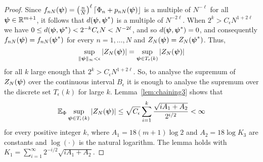 \documentclass[aap,preprint]{imsart}
\newcommand{\reals}{{\mathbb R}}
\newcommand{\expect}{{\mathbb E}}
\newcommand{\abs}[1]{\left\vert #1 \right\vert}
\newcommand{\sabs}[1]{\vert #1 \vert}
\newcommand{\round}[1]{{\left\lceil #1 \right\rfloor}}
\begin{document}
\begin{proof}
Since $f_{nN}(\psibf) = \left( \tfrac{n}{N}\right)^\ell \round{\Phi_n + p_{nN}(\psibf)}$ is a multiple of $N^{-\ell}$ for all $\psibf \in \reals^{m+1}$, it follows that $d(\boldsymbol{\psi}, \boldsymbol{\psi}^*)$ is a multiple of $N^{-2\ell}$.  When $2^k > C_\epsilon N^{1+2\ell}$ we have $0 \leq d(\boldsymbol{\psi}, \boldsymbol{\psi}^*) < 2^{-k} C_\epsilon N < N^{-2\ell}$, and so $d(\boldsymbol{\psi}, \boldsymbol{\psi}^*) = 0$, and consequently $f_{nN}(\boldsymbol{\psi}) = f_{nN}(\boldsymbol{\psi}^*)$  for every $n = 1, \dots, N$ and $Z_N(\boldsymbol{\psi}) = Z_N(\boldsymbol{\psi}^*)$.  Thus,
\[
\sup_{\|\psibf\|_{\infty} < \epsilon } \abs{ Z_N(\psibf) } = \sup_{\psibf \in T_\epsilon(k) } \abs{ Z_N(\psibf) }
\]
for all $k$ large enough that $2^{k} > C_\epsilon N^{1+2\ell}$.  So, to analyse the supremum of $Z_N(\boldsymbol{\psi})$ over the continuous interval $B_\epsilon$ it is enough to analyse the supremum over the discrete set $T_\epsilon(k)$ for large $k$.  
Lemma~\ref{lem:chaining3} shows that 
\[
\expect_{\Phi} \sup_{\psibf \in T_\epsilon(k) } \abs{ Z_N(\psibf) } \leq \sqrt{C_\epsilon} \sum_{i=1}^{k}\frac{\sqrt{ i A_1 + A_2}}{2^{i/2}} < \infty
\]
for every positive integer $k$, where $A_1 = 18(m+1)\log 2$ and $A_2 = 18\log K_3$ are constants and $\log(\cdot)$ is the natural logarithm.  The lemma holds with $K_1 =  \sum_{i=1}^{\infty}2^{-i/2}\sqrt{ i A_1 + A_2 }$.
\end{proof}
\end{document}
